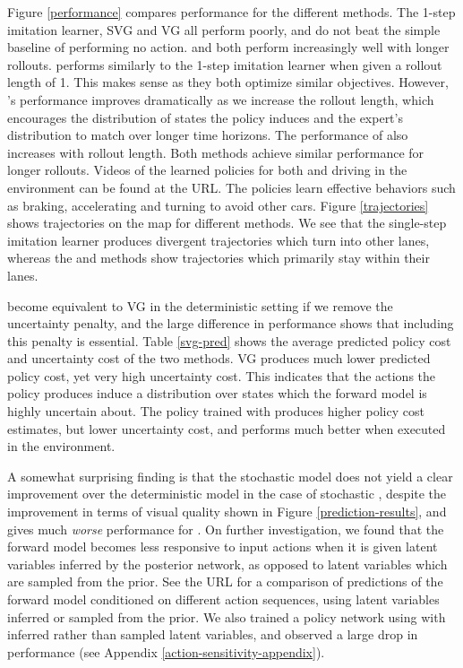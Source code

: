 \documentclass{article} %
\begin{document}
Figure \ref{performance} compares performance for the different methods.
The 1-step imitation learner, SVG and VG all perform poorly, and do not beat the simple baseline of performing no action.
\modelnamedrop and \modelnameil both perform increasingly well with longer rollouts.
\modelnameil performs similarly to the 1-step imitation learner when given a rollout length of 1.
This makes sense as they both optimize similar objectives.
However, \modelnameil's performance improves dramatically as we increase the rollout length, which encourages the distribution of states the policy induces and the expert's distribution to match over longer time horizons.
The performance of \modelnamedrop also increases with rollout length. Both methods achieve similar performance for longer rollouts.
Videos of the learned policies for both \modelnameil and \modelnamedrop driving in the environment can be found at the URL.
The policies learn effective behaviors such as braking, accelerating and turning to avoid other cars.
Figure \ref{trajectories} shows trajectories on the map for different methods. We see that the single-step imitation learner produces divergent trajectories which turn into other lanes, whereas the \modelnamedrop and \modelnameil methods show trajectories which primarily stay within their lanes.

\modelnamedrop become equivalent to VG in the deterministic setting if we remove the uncertainty penalty, and the large difference in performance shows that including this penalty is essential.
Table \ref{svg-pred} shows the average predicted policy cost and uncertainty cost of the two methods.
VG produces much lower predicted policy cost, yet very high uncertainty cost. This indicates that the actions the policy produces induce a distribution over states which the forward model is highly uncertain about. The policy trained with \modelnamedrop produces higher policy cost estimates, but lower uncertainty cost, and performs much better when executed in the environment.

A somewhat surprising finding is that the stochastic model does not yield a clear improvement over the deterministic model in the case of stochastic \modelnamedrop, despite the improvement in terms of visual quality shown in Figure \ref{prediction-results}, and gives much \textit{worse} performance for \modelnameil.
On further investigation, we found that the forward model becomes less responsive to input actions when it is given latent variables inferred by the posterior network, as opposed to latent variables which are sampled from the prior. See the URL for a comparison of predictions of the forward model conditioned on different action sequences, using latent variables inferred or sampled from the prior. We also trained a policy network using \modelnamedrop with inferred rather than sampled latent variables, and observed a large drop in performance (see Appendix \ref{action-sensitivity-appendix}).
\end{document}
